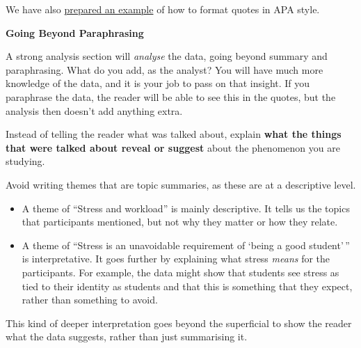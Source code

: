 \documentclass[
  english,
  letterpaper,
  DIV=11,
  numbers=noendperiod]{scrreprt}
\providecommand{\tightlist}{%
  \setlength{\itemsep}{0pt}\setlength{\parskip}{0pt}}
\begin{document}
We have also
\href{https://gla-my.sharepoint.com/:w:/g/personal/ashley_robertson_glasgow_ac_uk/EWfG8vjCAvtPjYPEJjQWxl8BPHlfzuI6weVkwIh_MVJSTQ?e=x7OT9m}{prepared
an example} of how to format quotes in APA style.

\textbf{Going Beyond Paraphrasing}

A strong analysis section will \emph{analyse} the data, going beyond
summary and paraphrasing. What do you add, as the analyst? You will have
much more knowledge of the data, and it is your job to pass on that
insight. If you paraphrase the data, the reader will be able to see this
in the quotes, but the analysis then doesn't add anything extra.

\begin{tcolorbox}[enhanced jigsaw, breakable, bottomtitle=1mm, leftrule=.75mm, opacityback=0, colbacktitle=quarto-callout-important-color!10!white, opacitybacktitle=0.6, toprule=.15mm, colback=white, left=2mm, coltitle=black, bottomrule=.15mm, titlerule=0mm, title=\textcolor{quarto-callout-important-color}{\faExclamation}\hspace{0.5em}{Important}, toptitle=1mm, colframe=quarto-callout-important-color-frame, arc=.35mm, rightrule=.15mm]

Instead of telling the reader what was talked about, explain
\textbf{what the things that were talked about reveal or suggest} about
the phenomenon you are studying.

\end{tcolorbox}

Avoid writing themes that are topic summaries, as these are at a
descriptive level.

\begin{itemize}
\tightlist
\item
  A theme of ``Stress and workload'' is mainly descriptive. It tells us
  the topics that participants mentioned, but not why they matter or how
  they relate.
\item
  A theme of ``Stress is an unavoidable requirement of `being a good
  student'\,'' is interpretative. It goes further by explaining what
  stress \emph{means} for the participants. For example, the data might
  show that students see stress as tied to their identity as students
  and that this is something that they expect, rather than something to
  avoid.
\end{itemize}

This kind of deeper interpretation goes beyond the superficial to show
the reader what the data suggests, rather than just summarising it.
\end{document}
